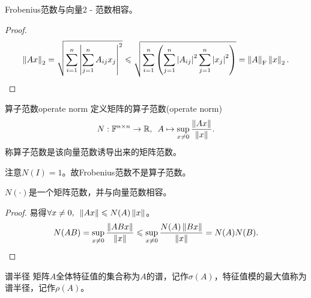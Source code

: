 \begin{example}
    {}{}
    Frobenius范数与向量2 - 范数相容。
    \begin{proof}
        \[
            \left\lVert Ax\right\rVert_2=\sqrt{\sum_{i=1}^n\left\lvert\sum_{j=1}^n A_{ij}x_j\right\rvert^2}\leqslant\sqrt{\sum_{i=1}^n\left(\sum_{j=1}^n\left\lvert A_{ij}\right\rvert^2\sum_{j=1}^n\left\lvert x_j\right\rvert^2\right)}=\left\lVert A\right\rVert_{\mathrm F}\left\lVert x\right\rVert_2.
            \qedhere
        \]
    \end{proof}
\end{example}

\begin{definition}
    {算子范数}{operate norm}
    定义矩阵的算子范数(operate norm)
    \begin{equation}
        N:\mathbb F^{n\times n}\to\mathbb R,\enspace A\mapsto\sup_{x\neq 0}\frac{\left\lVert Ax\right\rVert}{\left\lVert x\right\rVert}.
    \end{equation}
    称算子范数是该向量范数诱导出来的矩阵范数。
\end{definition}

注意$N(I)=1$。故Frobenius范数不是算子范数。

\begin{theorem}
    {}{}
    $N(\cdot)$是一个矩阵范数，并与向量范数相容。 
\end{theorem}

\begin{proof}
    易得$\forall x\neq 0,\enspace\left\lVert Ax\right\rVert\leqslant N(A)\left\lVert x\right\rVert$。
    \[
        N(AB)=\sup_{x\neq 0}\frac{\left\lVert ABx\right\rVert}{\left\lVert x\right\rVert}\leqslant\sup_{x\neq 0}\frac{N(A)\left\lVert Bx\right\rVert}{\left\lVert x\right\rVert}=N(A)N(B).
        \qedhere
    \]
\end{proof}

\begin{definition}
    {谱半径}{}
    矩阵$A$全体特征值的集合称为$A$的谱，记作$\sigma(A)$，特征值模的最大值称为谱半径，记作$\rho(A)$。
\end{definition}

